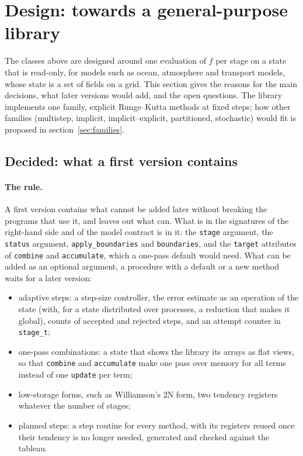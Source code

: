 \documentclass[11pt,a4paper]{article}
\newcommand{\code}[1]{\texttt{#1}}
\begin{document}
\section{Design: towards a general-purpose library}
\label{sec:design}

The classes above are designed around one evaluation of $f$ per stage on a
state that is read-only, for models such as ocean, atmosphere and transport
models, whose state is a set of fields on a grid. This section gives the
reasons for the main decisions, what later versions would add, and the open
questions. The library implements one family, explicit Runge--Kutta methods
at fixed steps; how other families (multistep, implicit,
implicit--explicit, partitioned, stochastic) would fit is proposed in
section~\ref{sec:families}.

\subsection{Decided: what a first version contains}
\label{sec:minimal}

\paragraph{The rule.} A first version contains what cannot be added later
without breaking the programs that use it, and leaves out what can. What is
in the signatures of the right-hand side and of the model contract is in it:
the \code{stage} argument, the \code{status} argument, \code{apply\_boundaries}
and \code{boundaries}, and the \code{target} attributes of \code{combine} and
\code{accumulate}, which a one-pass default would need. What can be added as
an optional argument, a procedure with a default or a new method waits for a
later version:
\begin{itemize}
  \item adaptive steps: a step-size controller, the error estimate as an
    operation of the state (with, for a state distributed over processes, a
    reduction that makes it global), counts of accepted and rejected steps,
    and an attempt counter in \code{stage\_t};
  \item one-pass combinations: a state that shows the library its arrays as
    flat views, so that \code{combine} and \code{accumulate} make one pass
    over memory for all terms instead of one \code{update} per term;
  \item low-storage forms, such as Williamson's 2N form, two tendency
    registers whatever the number of stages;
  \item planned steps: a step routine for every method, with its registers
    reused once their tendency is no longer needed, generated and checked
    against the tableau.
\end{itemize}
\end{document}
